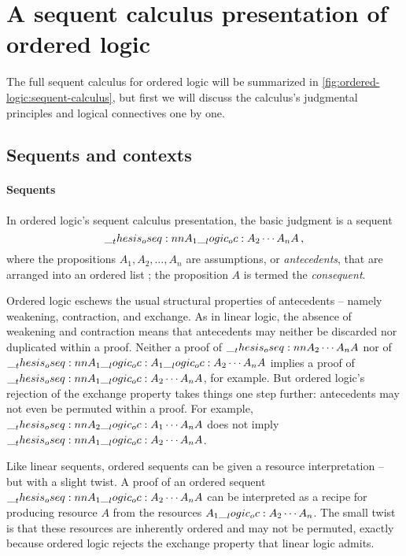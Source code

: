 \section{A sequent calculus presentation of ordered logic}\label{sec:ordered-logic:sequent-calculus}

The full sequent calculus for ordered logic will be summarized in \cref{fig:ordered-logic:sequent-calculus}, but first we will discuss the calculus's judgmental principles and logical connectives one by one.

\subsection{Sequents and contexts}

\paragraph{Seq\-uents}
In ordered logic's sequent calculus presentation, the basic judgment is a sequent
\begin{equation*}
  \oseq{A_1 \oc A_2 \dotsb A_n |- A} \,,
\end{equation*}
where the propositions $A_1, A_2, \dotsc, A_n$ are assumptions, or \emph{antecedents}, that are arranged into an ordered list%
; the proposition $A$ is termed the \emph{consequent}.

Ordered logic eschews the usual structural properties of antecedents -- namely weakening, contraction, and exchange.
As in linear logic, the absence of weakening and contraction means that
antecedents
may neither be discarded nor duplicated within a proof.
Neither a proof of $\oseq{A_2 \dotsb A_n |- A}$ nor of $\oseq{A_1 \oc A_1 \oc A_2 \dotsb A_n |- A}$ implies a proof of $\oseq{A_1 \oc A_2 \dotsb A_n |- A}$, for example.
But ordered logic's rejection of the exchange property takes things one step further: antecedents may not even be permuted within a proof.
For example, $\oseq{A_2 \oc A_1 \dotsb A_n |- A}$ does not imply $\oseq{A_1 \oc A_2 \dotsb A_n |- A}$.

Like linear sequents\autocite{Girard:TCS87}, ordered sequents can be given a resource interpretation -- but with a slight twist.
A proof of an ordered sequent
$\oseq{A_1 \oc A_2 \dotsb A_n |- A}$
can be interpreted as a recipe for producing resource $A$ from the resources $A_1 \__logic_oc: A_2 \dotsb A_n$.
The small twist is that these resources are inherently ordered and may not be permuted, exactly because ordered logic rejects the exchange property that linear logic admits.

